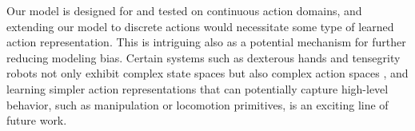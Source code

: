 Our model is designed for and tested on continuous action domains, and extending our model to discrete actions would necessitate some type of learned action representation. This is intriguing also as a potential mechanism for further reducing modeling bias. Certain systems such as dexterous hands and tensegrity robots not only exhibit complex state spaces but also complex action spaces \citep{hand-rail,hand-openai,superball}, and learning simpler action representations that can potentially capture high-level behavior, such as manipulation or locomotion primitives, is an exciting line of future work.
